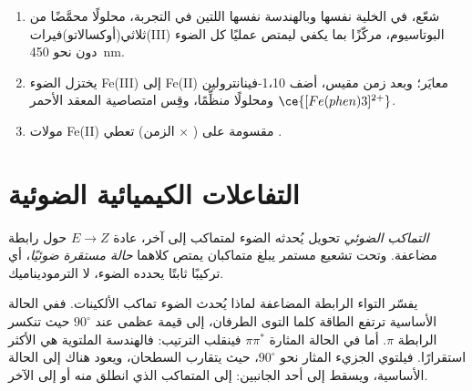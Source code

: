 \begin{method}\label{met:b3:photochemistry:actinometry}
\begin{enumerate}
  \item شعّع، في الخلية نفسها وبالهندسة نفسها اللتين في التجربة، محلولًا محمَّضًا
        من ثلاثي(أوكسالاتو)فيرات(III) البوتاسيوم، مركّزًا بما يكفي
        ليمتص عمليًا كل الضوء دون نحو \qty{450}{nm}.
  \item يختزل الضوء Fe(III) إلى Fe(II)  معايَر؛ وبعد
        زمن مقيس، أضف 1،10-فينانترولين ومحلولًا منظِّمًا، وقِس
        امتصاصية المعقد الأحمر $\ce{[Fe(phen)3]^{2+}}$.
  \item مولات Fe(II) مقسومة على ( $\times$ الزمن) تعطي .
\end{enumerate}
\end{method}

\section{التفاعلات الكيميائية الضوئية}

\begin{definition}\label{def:b3:photochemistry:photoisomerisation}
\emph{التماكب الضوئي} تحويل يُحدثه الضوء
لمتماكب إلى آخر، عادة $E \to Z$ حول رابطة مضاعفة. وتحت
تشعيع مستمر يبلغ متماكبان يمتص كلاهما
\emph{حالة مستقرة ضوئيًا}، أي تركيبًا ثابتًا
يحدده الضوء، لا الترموديناميك.
\end{definition}

يفسّر التواء الرابطة المضاعفة لماذا يُحدث الضوء تماكب الألكينات. ففي
الحالة الأساسية ترتفع الطاقة كلما التوى الطرفان، إلى قيمة عظمى عند $90^\circ$
حيث تنكسر الرابطة $\pi$. أما في الحالة المثارة $\pi\pi^*$ فينقلب الترتيب:
فالهندسة الملتوية هي الأكثر استقرارًا. فيلتوي الجزيء المثار نحو
$90^\circ$، حيث يتقارب السطحان، ويعود هناك إلى الحالة الأساسية،
ويسقط إلى أحد الجانبين: إلى المتماكب الذي انطلق منه أو إلى
الآخر.

